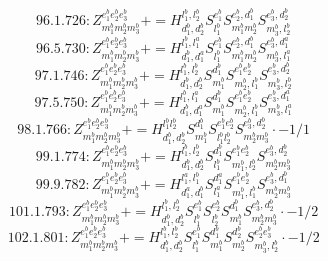 \documentclass[letterpaper,10pt,fleqn,leqno,onecolumn]{article}
\begin{document}
\begin{equation} \;\;\;\;\;\;  96.1.726: Z^{e_{1}^{b}e_{2}^{b}e_{3}^{b}}_{m_{1}^{b}m_{2}^{b}m_{3}^{b}}+=H^{l_{1}^{b},l_{2}^{b}}_{d_{1}^{b},d_{2}^{b}}S^{e_{1}^{b}}_{l_{1}^{b}}S^{e_{2}^{b},d_{1}^{b}}_{m_{1}^{b}m_{2}^{b}}S^{e_{3}^{b},d_{2}^{b}}_{m_{3}^{b},l_{2}^{b}} \end{equation}
\begin{equation} \;\;\;\;\;\;  96.5.730: Z^{e_{1}^{b}e_{2}^{b}e_{3}^{b}}_{m_{1}^{b}m_{2}^{b}m_{3}^{b}}+=H^{l_{1}^{b},l_{1}^{a}}_{d_{1}^{b},d_{1}^{a}}S^{e_{1}^{b}}_{l_{1}^{b}}S^{e_{2}^{b},d_{1}^{b}}_{m_{1}^{b}m_{2}^{b}}S^{e_{3}^{b},d_{1}^{a}}_{m_{3}^{b},l_{1}^{a}} \end{equation}
\begin{equation} \;\;\;\;\;\;  97.1.746: Z^{e_{1}^{b}e_{2}^{b}e_{3}^{b}}_{m_{1}^{b}m_{2}^{b}m_{3}^{b}}+=H^{l_{1}^{b},l_{2}^{b}}_{d_{1}^{b},d_{2}^{b}}S^{d_{1}^{b}}_{m_{1}^{b}}S^{e_{1}^{b}e_{2}^{b}}_{m_{2}^{b},l_{1}^{b}}S^{e_{3}^{b},d_{2}^{b}}_{m_{3}^{b},l_{2}^{b}} \end{equation}
\begin{equation} \;\;\;\;\;\;  97.5.750: Z^{e_{1}^{b}e_{2}^{b}e_{3}^{b}}_{m_{1}^{b}m_{2}^{b}m_{3}^{b}}+=H^{l_{1}^{b},l_{1}^{a}}_{d_{1}^{b},d_{1}^{a}}S^{d_{1}^{b}}_{m_{1}^{b}}S^{e_{1}^{b}e_{2}^{b}}_{m_{2}^{b},l_{1}^{b}}S^{e_{3}^{b},d_{1}^{a}}_{m_{3}^{b},l_{1}^{a}} \end{equation}
\begin{equation} \;\;\;\;\;\;  98.1.766: Z^{e_{1}^{b}e_{2}^{b}e_{3}^{b}}_{m_{1}^{b}m_{2}^{b}m_{3}^{b}}+=H^{l_{1}^{b}l_{2}^{b}}_{d_{1}^{b},d_{2}^{b}}S^{d_{1}^{b}}_{m_{1}^{b}}S^{e_{1}^{b}e_{2}^{b}}_{l_{1}^{b}l_{2}^{b}}S^{e_{3}^{b},d_{2}^{b}}_{m_{2}^{b}m_{3}^{b}}\cdot -1/1 \end{equation}
\begin{equation} \;\;\;\;\;\;  99.1.774: Z^{e_{1}^{b}e_{2}^{b}e_{3}^{b}}_{m_{1}^{b}m_{2}^{b}m_{3}^{b}}+=H^{l_{1}^{b},l_{2}^{b}}_{d_{1}^{b},d_{2}^{b}}S^{d_{1}^{b}}_{l_{1}^{b}}S^{e_{1}^{b}e_{2}^{b}}_{m_{1}^{b},l_{2}^{b}}S^{e_{3}^{b},d_{2}^{b}}_{m_{2}^{b}m_{3}^{b}} \end{equation}
\begin{equation} \;\;\;\;\;\;  99.9.782: Z^{e_{1}^{b}e_{2}^{b}e_{3}^{b}}_{m_{1}^{b}m_{2}^{b}m_{3}^{b}}+=H^{l_{1}^{a},l_{1}^{b}}_{d_{1}^{a},d_{1}^{b}}S^{d_{1}^{a}}_{l_{1}^{a}}S^{e_{1}^{b}e_{2}^{b}}_{m_{1}^{b},l_{1}^{b}}S^{e_{3}^{b},d_{1}^{b}}_{m_{2}^{b}m_{3}^{b}} \end{equation}
\begin{equation} \;\;\;\;\;\;  101.1.793: Z^{e_{1}^{b}e_{2}^{b}e_{3}^{b}}_{m_{1}^{b}m_{2}^{b}m_{3}^{b}}+=H^{l_{1}^{b},l_{2}^{b}}_{d_{1}^{b},d_{2}^{b}}S^{e_{1}^{b}}_{l_{1}^{b}}S^{e_{2}^{b}}_{l_{2}^{b}}S^{d_{1}^{b}}_{m_{1}^{b}}S^{e_{3}^{b},d_{2}^{b}}_{m_{2}^{b}m_{3}^{b}}\cdot -1/2 \end{equation}
\begin{equation} \;\;\;\;\;\;  102.1.801: Z^{e_{1}^{b}e_{2}^{b}e_{3}^{b}}_{m_{1}^{b}m_{2}^{b}m_{3}^{b}}+=H^{l_{1}^{b},l_{2}^{b}}_{d_{1}^{b},d_{2}^{b}}S^{e_{1}^{b}}_{l_{1}^{b}}S^{d_{1}^{b}}_{m_{1}^{b}}S^{d_{2}^{b}}_{m_{2}^{b}}S^{e_{2}^{b}e_{3}^{b}}_{m_{3}^{b},l_{2}^{b}}\cdot -1/2 \end{equation}
\end{document}
